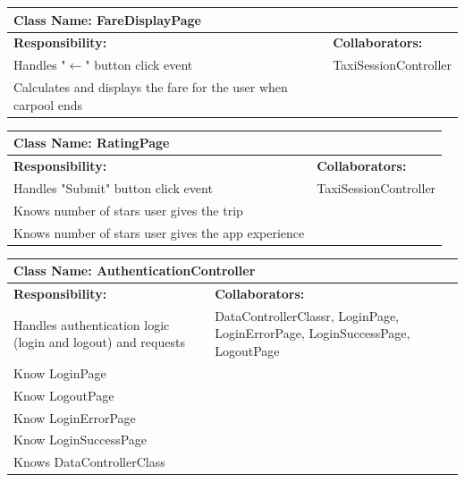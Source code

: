 \documentclass[]{article}
\begin{document}
	\begin{table}[H]
	\centering
	\begin{tabular}{|p{6cm}|p{6cm}|}
	\hline 
		\multicolumn{2}{|l|}{\textbf{Class Name: FareDisplayPage}} \\
	\hline
	\textbf{Responsibility:} & \textbf{Collaborators:} \\
	\hline
	Handles "$\xleftarrow{}$" button click event  & TaxiSessionController \\ \hline
	Calculates and displays the fare for the user when carpool ends & \\ \hline
	\end{tabular}
	\end{table}
	
	\begin{table}[H]
	\centering
	\begin{tabular}{|p{6cm}|p{6cm}|}
	\hline 
		\multicolumn{2}{|l|}{\textbf{Class Name: RatingPage}} \\
	\hline
	\textbf{Responsibility:} & \textbf{Collaborators:} \\
	\hline
	Handles "Submit" button click event  & TaxiSessionController \\ \hline
	Knows number of stars user gives the trip & \\ \hline
	Knows number of stars user gives the app experience & \\ \hline
	\end{tabular}
	\end{table}
	
	\begin{table}[H]
	\centering
	\begin{tabular}{|p{6cm}|p{6cm}|}
	\hline 
		\multicolumn{2}{|l|}{\textbf{Class Name: AuthenticationController}} \\
	\hline
	\textbf{Responsibility:} & \textbf{Collaborators:} \\
	\hline
	Handles authentication logic (login and logout) and requests & DataControllerClassr, LoginPage, LoginErrorPage, LoginSuccessPage, LogoutPage\\ \hline 
	Know LoginPage & \\ \hline 
	Know LogoutPage & \\ \hline 
	Know LoginErrorPage & \\ \hline
	Know LoginSuccessPage & \\ \hline
	Knows DataControllerClass& \\ \hline
	\end{tabular}
	\end{table}
\end{document}
